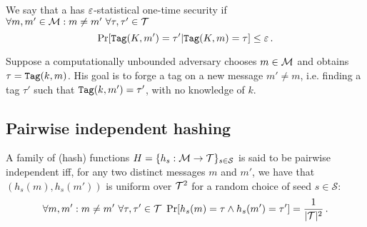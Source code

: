 \begin{definition}
	We say that a \Mac{} has $\varepsilon$-statistical one-time security if $\forall m, m' \in \mathcal{M} : m \neq m' \ \forall \tau, \tau' \in \mathcal{T}$
	\begin{equation}
		\Pr[\texttt{Tag}(K,m') = \tau' | \texttt{Tag}(K,m) = \tau] \leq \varepsilon \, .
	\end{equation}
\end{definition}

Suppose a computationally unbounded adversary chooses $m \in \mathcal{M}$ and obtains $\tau = \texttt{Tag}(k, m)$.
His goal is to forge a tag on a new message $m' \neq m$, i.e. finding a tag $\tau'$ such that $\texttt{Tag}(k,m') = \tau'$, with no knowledge of $k$.


\subsection{Pairwise independent hashing}
\begin{definition}
    A family of (hash) functions $H = \{h_s:\mathcal{M} \to \mathcal{T}\}_{s \in \mathcal{S}}$ is said to be pairwise independent iff, for any two distinct messages $m$ and $m'$, we have that $(h_s(m), h_s(m'))$ is uniform over $\mathcal{T}^2$ for a random choice of seed $s \in \mathcal{S}$:
    \[
        \forall m, m' : m \neq m' \ \forall \tau, \tau' \in \mathcal{T} \ \Pr[h_s(m) = \tau \wedge h_s(m') = \tau'] = \frac{1}{|\mathcal{T}|^2} \, .
    \]
\end{definition}



